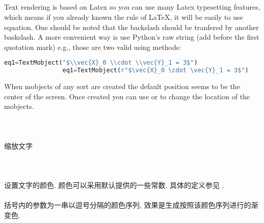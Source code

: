     \subsection{}
        \hspace*{2em}Text rendering is based on Latex so you can use many Latex typesetting features, which means if you already known the rule of \LaTeX, it will be easily to use equation. One should be noted that the backslash should be tranfered by another baskslash. A more convenient way is use Python's raw string (add  before the first quotation mark) e.g., those are two valid using methods:
            \begin{lstlisting}[language = {Python}, gobble = 16]
                eq1=TextMobject("$\\vec{X}_0 \\cdot \\vec{Y}_1 = 3$")
                eq1=TextMobject(r"$\vec{X}_0 \cdot \vec{Y}_1 = 3$")
            \end{lstlisting}
        \hspace*{2em}When mobjects of any sort are created the default position seems to be the center of the screen. Once created you can use  or  to change the location of the mobjects.

        \paragraph{ \\}
            \hspace*{2em}缩放文字

        \paragraph{ \\}
            \hspace*{2em}设置文字的颜色. 颜色可以采用默认提供的一些常数. 具体的定义参见 . 

        \paragraph{}
            \hspace*{2em}括号内的参数为一串以逗号分隔的颜色序列, 效果是生成按照该颜色序列进行的渐变色.

